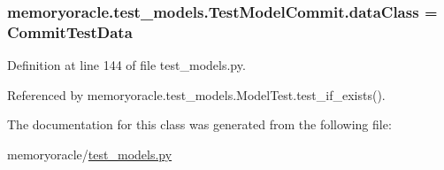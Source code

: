 \subsubsection[{data\+Class}]{\setlength{\rightskip}{0pt plus 5cm}memoryoracle.\+test\+\_\+models.\+Test\+Model\+Commit.\+data\+Class = {\bf Commit\+Test\+Data}\hspace{0.3cm}{\ttfamily [static]}}\label{classmemoryoracle_1_1test__models_1_1TestModelCommit_a313941fb8ac310870f9c859b7fb39f9e}


Definition at line 144 of file test\+\_\+models.\+py.



Referenced by memoryoracle.\+test\+\_\+models.\+Model\+Test.\+test\+\_\+if\+\_\+exists().



The documentation for this class was generated from the following file\+:\begin{DoxyCompactItemize}
\item 
memoryoracle/\hyperlink{test__models_8py}{test\+\_\+models.\+py}\end{DoxyCompactItemize}

